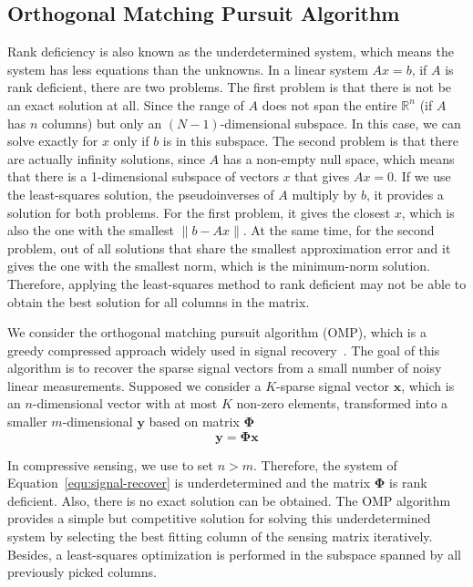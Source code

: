 \subsection{Orthogonal Matching Pursuit Algorithm}
Rank deficiency is also known as the underdetermined system, which means the system has less equations than the unknowns. In a linear system $Ax=b$, if $A$ is rank deficient, there are two problems. The first problem is that there is not be an exact solution at all. Since the range of $A$ does not span the entire $\mathbb{R}^n$ (if $A$ has $n$ columns) but only an $(N-1)$-dimensional subspace. In this case, we can solve exactly for $x$ only if $b$ is in this subspace. The second problem is that there are actually infinity solutions, since $A$ has a non-empty null space, which means that there is a 1-dimensional subspace of vectors $x$ that gives $Ax=0$. If we use the least-squares solution, the pseudoinverses of $A$ multiply by $b$, it provides a solution for both problems. For the first problem, it gives the closest $x$, which is also the one with the smallest $\|b-Ax\|$. At the same time, for the second problem, out of all solutions that share the smallest approximation error and it gives the one with the smallest norm, which is the minimum-norm solution. Therefore, applying the least-squares method to rank deficient may not be able to obtain the best solution for all columns in the matrix. 
\par We consider the orthogonal matching pursuit algorithm (OMP), which is a greedy compressed approach widely used in signal recovery~\citep{MS:93}. The goal of this algorithm is to recover the sparse signal vectors from a small number of noisy linear measurements. Supposed we consider a $K$-sparse signal vector $\mathbf{x}$, which is an $n$-dimensional vector with at most $K$ non-zero elements, transformed into a smaller $m$-dimensional $\mathbf{y}$ based on matrix $\mathbf{\Phi}$
\begin{equation}
    \label{equ:signal-recover}
    \mathbf{y}=\mathbf{\Phi} \mathbf{x}
\end{equation}
\par In compressive sensing, we use to set $n > m$. Therefore, the system of Equation~\ref{equ:signal-recover} is underdetermined and the matrix $\mathbf{\Phi}$ is rank deficient. Also, there is no exact solution can be obtained. The OMP algorithm provides a simple but competitive solution for solving this underdetermined system by selecting the best fitting column of the sensing matrix iteratively. Besides, a least-squares optimization is performed in the subspace spanned by all previously picked columns. 
